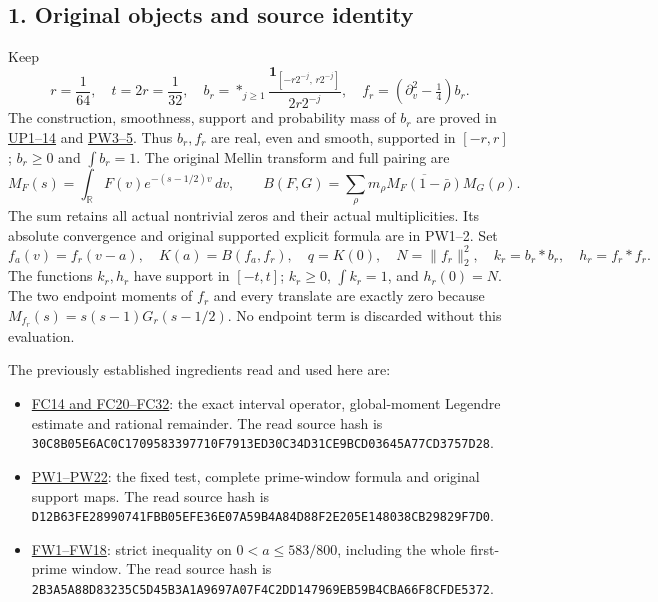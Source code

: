 \documentclass[
  10pt,
  a4paper,
]{article}
\providecommand{\tightlist}{%
  \setlength{\itemsep}{0pt}\setlength{\parskip}{0pt}}
\begin{document}
\subsection{1. Original objects and source
identity}\label{original-objects-and-source-identity}

Keep \[
 r=\frac1{64},\quad t=2r=\frac1{32},\quad
 b_r=\mathop{*}_{j\ge1}
      \frac{\mathbf1_{[-r2^{-j},\,r2^{-j}]}}{2r2^{-j}},
 \quad f_r=(\partial_v^2-\tfrac14)b_r.
 \tag{FP3}
\] The construction, smoothness, support and probability mass of \(b_r\)
are proved in
\href{UNIVERSAL_PRIMITIVE_TRANSLATION_CRITERION.md}{UP1--14} and
\href{PRIMITIVE_PRIME_WINDOW_DERIVATION.md}{PW3--5}. Thus \(b_r,f_r\)
are real, even and smooth, supported in \([-r,r]\); \(b_r\ge0\) and
\(\int b_r=1\). The original Mellin transform and full pairing are \[
 M_F(s)=\int_{\mathbb R}F(v)e^{-(s-1/2)v}\,dv,\qquad
 B(F,G)=\sum_\rho m_\rho
       \overline{M_F(1-\bar\rho)}M_G(\rho).
 \tag{FP4}
\] The sum retains all actual nontrivial zeros and their actual
multiplicities. Its absolute convergence and original supported explicit
formula are in PW1--2. Set \[
 f_a(v)=f_r(v-a),\quad K(a)=B(f_a,f_r),\quad
 q=K(0),\quad N=\|f_r\|_2^2,\quad
 k_r=b_r*b_r,\quad h_r=f_r*f_r.
 \tag{FP5}
\] The functions \(k_r,h_r\) have support in \([-t,t]\); \(k_r\ge0\),
\(\int k_r=1\), and \(h_r(0)=N\). The two endpoint moments of \(f_r\)
and every translate are exactly zero because
\(M_{f_r}(s)=s(s-1)G_r(s-1/2)\). No endpoint term is discarded without
this evaluation.

The previously established ingredients read and used here are:

\begin{itemize}
\tightlist
\item
  \href{FIRST_PRIME_FULL_WEIL_COERCIVITY.md}{FC14 and FC20--FC32}: the
  exact interval operator, global-moment Legendre estimate and rational
  remainder. The read source hash is
  \texttt{30C8B05E\allowbreak{}6AC0C170\allowbreak{}95833977\allowbreak{}10F7913E\allowbreak{}D30C34D3\allowbreak{}1CE9BCD0\allowbreak{}3645A77C\allowbreak{}D3757D28}.
\item
  \href{PRIMITIVE_PRIME_WINDOW_DERIVATION.md}{PW1--PW22}: the fixed
  test, complete prime-window formula and original support maps. The
  read source hash is
  \texttt{D12B63FE\allowbreak{}28990741\allowbreak{}FBB05EFE\allowbreak{}36E07A59\allowbreak{}B4A84D88\allowbreak{}F2E205E1\allowbreak{}48038CB2\allowbreak{}9829F7D0}.
\item
  \href{FIRST_PRIME_WINDOW_BOUND.md}{FW1--FW18}: strict inequality on
  \(0<a\le583/800\), including the whole first-prime window. The read
  source hash is
  \texttt{2B3A5A88\allowbreak{}D83235C5\allowbreak{}D45B3A1A\allowbreak{}9697A07F\allowbreak{}4C2DD147\allowbreak{}969EB59B\allowbreak{}4CBA66F8\allowbreak{}CFDE5372}.
\end{itemize}
\end{document}
